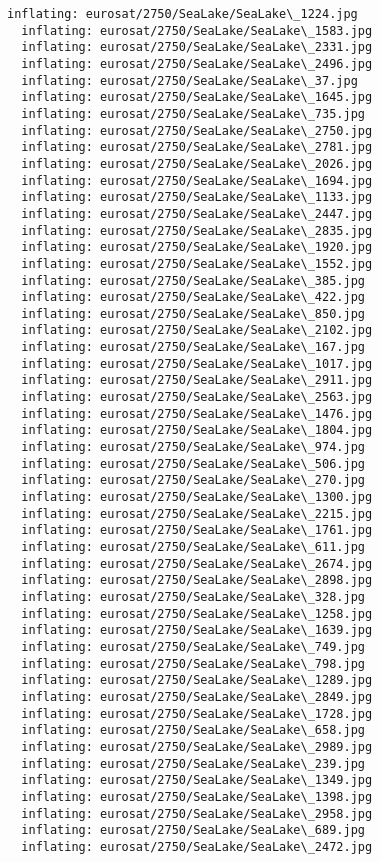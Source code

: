 \documentclass[11pt]{article}
\begin{document}
\begin{Verbatim}[commandchars=\\\{\}]
  inflating: eurosat/2750/SeaLake/SeaLake\_1224.jpg
  inflating: eurosat/2750/SeaLake/SeaLake\_1583.jpg
  inflating: eurosat/2750/SeaLake/SeaLake\_2331.jpg
  inflating: eurosat/2750/SeaLake/SeaLake\_2496.jpg
  inflating: eurosat/2750/SeaLake/SeaLake\_37.jpg
  inflating: eurosat/2750/SeaLake/SeaLake\_1645.jpg
  inflating: eurosat/2750/SeaLake/SeaLake\_735.jpg
  inflating: eurosat/2750/SeaLake/SeaLake\_2750.jpg
  inflating: eurosat/2750/SeaLake/SeaLake\_2781.jpg
  inflating: eurosat/2750/SeaLake/SeaLake\_2026.jpg
  inflating: eurosat/2750/SeaLake/SeaLake\_1694.jpg
  inflating: eurosat/2750/SeaLake/SeaLake\_1133.jpg
  inflating: eurosat/2750/SeaLake/SeaLake\_2447.jpg
  inflating: eurosat/2750/SeaLake/SeaLake\_2835.jpg
  inflating: eurosat/2750/SeaLake/SeaLake\_1920.jpg
  inflating: eurosat/2750/SeaLake/SeaLake\_1552.jpg
  inflating: eurosat/2750/SeaLake/SeaLake\_385.jpg
  inflating: eurosat/2750/SeaLake/SeaLake\_422.jpg
  inflating: eurosat/2750/SeaLake/SeaLake\_850.jpg
  inflating: eurosat/2750/SeaLake/SeaLake\_2102.jpg
  inflating: eurosat/2750/SeaLake/SeaLake\_167.jpg
  inflating: eurosat/2750/SeaLake/SeaLake\_1017.jpg
  inflating: eurosat/2750/SeaLake/SeaLake\_2911.jpg
  inflating: eurosat/2750/SeaLake/SeaLake\_2563.jpg
  inflating: eurosat/2750/SeaLake/SeaLake\_1476.jpg
  inflating: eurosat/2750/SeaLake/SeaLake\_1804.jpg
  inflating: eurosat/2750/SeaLake/SeaLake\_974.jpg
  inflating: eurosat/2750/SeaLake/SeaLake\_506.jpg
  inflating: eurosat/2750/SeaLake/SeaLake\_270.jpg
  inflating: eurosat/2750/SeaLake/SeaLake\_1300.jpg
  inflating: eurosat/2750/SeaLake/SeaLake\_2215.jpg
  inflating: eurosat/2750/SeaLake/SeaLake\_1761.jpg
  inflating: eurosat/2750/SeaLake/SeaLake\_611.jpg
  inflating: eurosat/2750/SeaLake/SeaLake\_2674.jpg
  inflating: eurosat/2750/SeaLake/SeaLake\_2898.jpg
  inflating: eurosat/2750/SeaLake/SeaLake\_328.jpg
  inflating: eurosat/2750/SeaLake/SeaLake\_1258.jpg
  inflating: eurosat/2750/SeaLake/SeaLake\_1639.jpg
  inflating: eurosat/2750/SeaLake/SeaLake\_749.jpg
  inflating: eurosat/2750/SeaLake/SeaLake\_798.jpg
  inflating: eurosat/2750/SeaLake/SeaLake\_1289.jpg
  inflating: eurosat/2750/SeaLake/SeaLake\_2849.jpg
  inflating: eurosat/2750/SeaLake/SeaLake\_1728.jpg
  inflating: eurosat/2750/SeaLake/SeaLake\_658.jpg
  inflating: eurosat/2750/SeaLake/SeaLake\_2989.jpg
  inflating: eurosat/2750/SeaLake/SeaLake\_239.jpg
  inflating: eurosat/2750/SeaLake/SeaLake\_1349.jpg
  inflating: eurosat/2750/SeaLake/SeaLake\_1398.jpg
  inflating: eurosat/2750/SeaLake/SeaLake\_2958.jpg
  inflating: eurosat/2750/SeaLake/SeaLake\_689.jpg
  inflating: eurosat/2750/SeaLake/SeaLake\_2472.jpg

\end{Verbatim}
\end{document}
